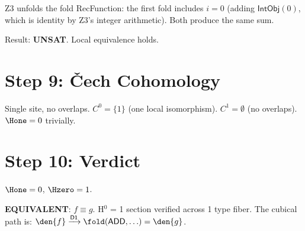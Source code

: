 Z3 unfolds the fold RecFunction: the first fold includes $i=0$
(adding $\mathsf{IntObj}(0)$, which is identity by Z3's integer
arithmetic).  Both produce the same sum.

Result: \textbf{UNSAT}.  Local equivalence holds.

\section{Step 9: \v{C}ech Cohomology}

Single site, no overlaps.  $C^0 = \{1\}$ (one local isomorphism).
$C^1 = \emptyset$ (no overlaps).  $\Hone = 0$ trivially.

\section{Step 10: Verdict}

$\Hone = 0$, $\Hzero = 1$.

\textbf{EQUIVALENT}: $f \equiv g$.  H$^0$ = 1 section verified
across 1 type fiber.  The cubical path is:
$\den{f} \xrightarrow{\mathsf{D1}} \fold(\mathsf{ADD}, \ldots)
= \den{g}$.



